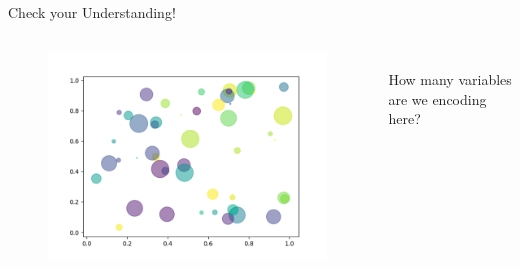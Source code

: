 \documentclass[aspectratio=169]{../latex_main/tntbeamer}  %
\begin{document}
	\begin{frame}{Check your Understanding!}
	    \begin{columns}
	        \begin{column}{.5\textwidth}
	              \begin{figure}
	                  \includegraphics[width=1.0\textwidth]{Bild15}
	               \end{figure} 
	        \end{column}
	        
	        \begin{column}{.5\textwidth}
	              \bigskip
	              \bigskip
	              \\How many variables are we encoding here?
	        \end{column}
	        
	    \end{columns}
	\end{frame}
	
	
	
\end{document}
